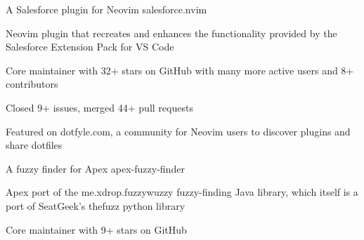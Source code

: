 

\begin{cventries}

  \cventry
    {A Salesforce plugin for Neovim} 
    {salesforce.nvim} 
    {} %
    {} %
    {
      \begin{cvitems} %
        \item {Neovim plugin that recreates and enhances the functionality provided by the Salesforce Extension Pack for VS Code}
        \item {Core maintainer with 32+ stars on GitHub with many more active users and 8+ contributors}
        \item {Closed 9+ issues, merged 44+ pull requests}
        \item {Featured on dotfyle.com, a community for Neovim users to discover plugins and share dotfiles}
      \end{cvitems}
    }

  \cventry
    {A fuzzy finder for Apex} 
    {apex-fuzzy-finder} 
    {} %
    {} %
    {
      \begin{cvitems} %
        \item {Apex port of the me.xdrop.fuzzywuzzy fuzzy-finding Java library, which itself is a port of SeatGeek's thefuzz python library}
        \item {Core maintainer with 9+ stars on GitHub}
      \end{cvitems}
    }

\end{cventries}
